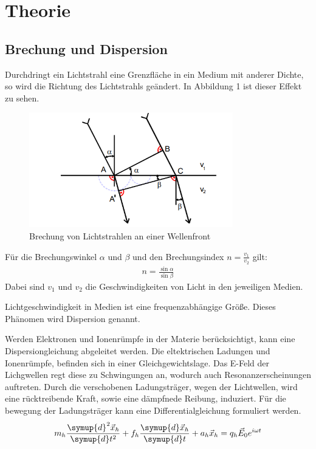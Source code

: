 \section{Theorie}
\label{sec:Theorie}

\subsection{Brechung und Dispersion}
Durchdringt ein Lichtstrahl eine Grenzfläche in ein Medium mit anderer Dichte, so wird die Richtung des Lichtstrahls geändert. In Abbildung 1
ist dieser Effekt zu sehen.

\begin{figure}[H]
  \centering
  \includegraphics[height=5cm]{wellenfront.PNG}
  \caption{Brechung von Lichtstrahlen an einer Wellenfront \cite{sample}}
  \label{fig:biegungbild1}
\end{figure}

Für die Brechungswinkel $\alpha$ und $\beta$ und den Brechungsindex $n = \frac{v_1}{v_2}$ gilt:
\begin{align}
  n = \frac{\sin{\alpha}}{\sin{\beta}}
\end{align}
 Dabei sind $v_1$ und $v_2$ die Geschwindigkeiten von Licht in den jeweiligen Medien.

Lichtgeschwindigkeit in Medien ist eine frequenzabhängige Größe. Dieses Phänomen wird Dispersion genannt.

Werden Elektronen und Ionenrümpfe in der Materie berücksichtigt, kann eine Dispersiongleichung abgeleitet werden. Die
eltektrischen Ladungen und Ionenrümpfe, befinden sich in einer Gleichgewichtslage. Das E-Feld der Lichgwellen regt diese
zu Schwingungen an, wodurch auch Resonanzerscheinungen auftreten. Durch die verschobenen Ladungsträger, wegen der Lichtwellen, wird
eine rücktreibende Kraft, sowie eine dämpfnede Reibung, induziert. Für die bewegung der Ladungsträger kann eine Differentialgleichung
formuliert werden.
\begin{align}
  m_h \frac{\symup{d}^2 \vec{x}_h}{\symup{d}t^2} + f_h \frac{\symup{d} \vec{x}_h}{\symup{d}t} + a_h \vec{x}_h = q_h \vec{E}_0 e^{i\omega t}
\end{align}

